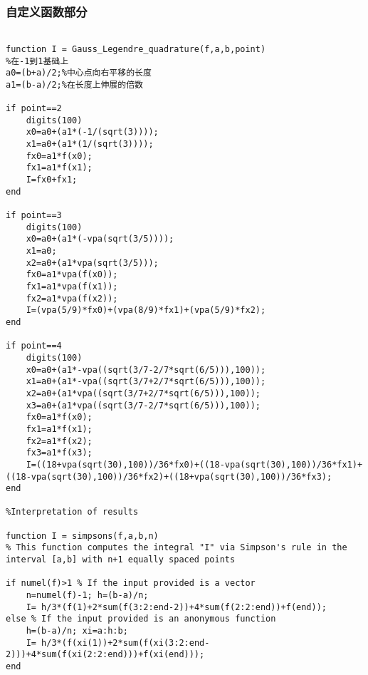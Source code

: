 \documentclass{ctexart}%
\begin{document}
\subsubsection{自定义函数部分}
\begin{lstlisting}

function I = Gauss_Legendre_quadrature(f,a,b,point)
%在-1到1基础上
a0=(b+a)/2;%中心点向右平移的长度
a1=(b-a)/2;%在长度上伸展的倍数

if point==2
    digits(100)
    x0=a0+(a1*(-1/(sqrt(3))));
    x1=a0+(a1*(1/(sqrt(3))));
    fx0=a1*f(x0);
    fx1=a1*f(x1);
    I=fx0+fx1;
end

if point==3
    digits(100)
    x0=a0+(a1*(-vpa(sqrt(3/5))));
    x1=a0;
    x2=a0+(a1*vpa(sqrt(3/5)));
    fx0=a1*vpa(f(x0));
    fx1=a1*vpa(f(x1));
    fx2=a1*vpa(f(x2));
    I=(vpa(5/9)*fx0)+(vpa(8/9)*fx1)+(vpa(5/9)*fx2);
end

if point==4
    digits(100)
    x0=a0+(a1*-vpa((sqrt(3/7-2/7*sqrt(6/5))),100));
    x1=a0+(a1*-vpa((sqrt(3/7+2/7*sqrt(6/5))),100));
    x2=a0+(a1*vpa((sqrt(3/7+2/7*sqrt(6/5))),100));
    x3=a0+(a1*vpa((sqrt(3/7-2/7*sqrt(6/5))),100));
    fx0=a1*f(x0);
    fx1=a1*f(x1);
    fx2=a1*f(x2);
    fx3=a1*f(x3);
    I=((18+vpa(sqrt(30),100))/36*fx0)+((18-vpa(sqrt(30),100))/36*fx1)+((18-vpa(sqrt(30),100))/36*fx2)+((18+vpa(sqrt(30),100))/36*fx3);
end

%Interpretation of results

function I = simpsons(f,a,b,n)
% This function computes the integral "I" via Simpson's rule in the interval [a,b] with n+1 equally spaced points

if numel(f)>1 % If the input provided is a vector
    n=numel(f)-1; h=(b-a)/n;
    I= h/3*(f(1)+2*sum(f(3:2:end-2))+4*sum(f(2:2:end))+f(end));
else % If the input provided is an anonymous function
    h=(b-a)/n; xi=a:h:b;
    I= h/3*(f(xi(1))+2*sum(f(xi(3:2:end-2)))+4*sum(f(xi(2:2:end)))+f(xi(end)));
end



\end{lstlisting}
\end{document}
